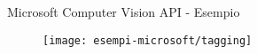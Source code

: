 %
\begin{frame}[t]{Microsoft Computer Vision API - Esempio}
	\begin{figure}[h]
	\centering
	    \texttt{[image: esempi-microsoft/tagging]}
		\label{fig:esempio-microsoft-1}
	\end{figure}
\end{frame}
%
